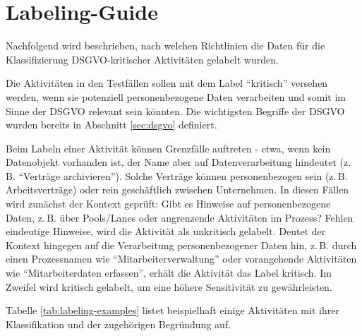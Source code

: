 \section{Labeling-Guide}\label{sec:labeling-guide}

Nachfolgend wird beschrieben, nach welchen Richtlinien die Daten für die Klassifizierung \ac{DSGVO}-kritischer Aktivitäten gelabelt wurden.

Die Aktivitäten in den Testfällen sollen mit dem Label \enquote{kritisch} versehen werden, wenn sie potenziell personenbezogene Daten verarbeiten und somit im Sinne der \ac{DSGVO} relevant sein könnten. Die wichtigsten Begriffe der \ac{DSGVO} wurden bereits in Abschnitt \ref{sec:dsgvo} definiert.

Beim Labeln einer Aktivität können Grenzfälle auftreten - etwa, wenn kein Datenobjekt vorhanden ist, der Name aber auf Datenverarbeitung hindeutet (z.\,B. \enquote{Verträge archivieren}). Solche Verträge können personenbezogen sein (z.\,B. Arbeitsverträge) oder rein geschäftlich zwischen Unternehmen. In diesen Fällen wird zunächst der Kontext geprüft: Gibt es Hinweise auf personenbezogene Daten, z.\,B. über Pools/Lanes oder angrenzende Aktivitäten im Prozess? Fehlen eindeutige Hinweise, wird die Aktivität als unkritisch gelabelt. Deutet der Kontext hingegen auf die Verarbeitung personenbezogener Daten hin, z.\,B. durch einen Prozessnamen wie \enquote{Mitarbeiterverwaltung} oder vorangehende Aktivitäten wie \enquote{Mitarbeiterdaten erfassen}, erhält die Aktivität das Label kritisch. Im Zweifel wird kritisch gelabelt, um eine höhere Sensitivität zu gewährleisten.

Tabelle \ref{tab:labeling-examples} listet beispielhaft einige Aktivitäten mit ihrer Klassifikation und der zugehörigen Begründung auf.

